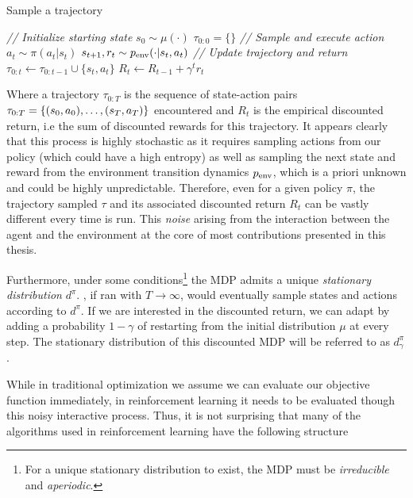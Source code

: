 \begin{center}
\begin{minipage}{0.9\textwidth}
\begin{algorithm}[H]
\caption{Sample a trajectory}
\label{alg:sample_traj}
\begin{algorithmic}[1]
\STATE \textit{// Initialize starting state}
\STATE $s_0 \sim \mu(\cdot)$
\STATE $\tau_{0:0} = \{ \}$
\STATE \textit{// Sample and execute action}
\STATE $a_t \sim \pi(a_t|s_t)$
\STATE $s_{t+1}, r_t \sim p_{\text{env}}(\cdot | s_t, a_t)$
\STATE \textit{// Update trajectory and return}
\STATE $\tau_{0:t} \leftarrow \tau_{0:t-1} \cup \{s_t, a_t\}$
\STATE $R_t \leftarrow R_{t-1} + \gamma^t r_t$
\ENDFOR
\end{algorithmic}
\end{algorithm}
\end{minipage}
\end{center}
\vspace{1em}

Where a trajectory $\tau_{0:T}$ is the sequence of state-action pairs $\tau_{0:T}=\{(s_0,a_0), \ldots,(s_T, a_T) \}$ encountered and $R_t$ is the empirical discounted return, i.e the sum of discounted rewards for this trajectory. It appears clearly that this process is highly stochastic as it requires sampling actions from our policy (which could have a high entropy) as well as sampling the next state and reward from the environment transition dynamics $p_{\text{env}}$, which is a priori unknown and could be highly unpredictable. Therefore, even for a given policy $\pi$, the trajectory sampled $\tau$ and its associated discounted return $R_t$ can be vastly different every time  is run. This \emph{noise} arising from the interaction between the agent and the environment at the core of most contributions presented in this thesis.

Furthermore, under some conditions\footnote{For a unique stationary distribution to exist, the MDP must be \emph{irreducible} and \emph{aperiodic}.} the MDP admits a unique \emph{stationary distribution} $d^\pi$. , if ran with $T\to\infty$, would eventually sample states and actions according to $d^\pi$. If we are interested in the discounted return, we can adapt  by adding a probability $1-\gamma$ of restarting from the initial distribution $\mu$ at every step. The stationary distribution of this discounted MDP will be referred to as $d^\pi_\gamma$.

While in traditional optimization we assume we can evaluate our objective function immediately, in reinforcement learning it needs to be evaluated though this noisy interactive process. Thus, it is not surprising that many of the algorithms used in reinforcement learning have the following structure

